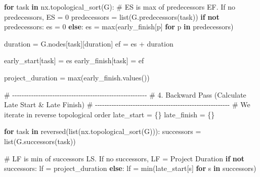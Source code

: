 \documentclass[
  letterpaper,
  DIV=11,
  numbers=noendperiod]{scrreprt}
\newenvironment{Shaded}{\begin{snugshade}}{\end{snugshade}}
\newcommand{\BuiltInTok}[1]{\textcolor[rgb]{0.00,0.23,0.31}{#1}}
\newcommand{\CommentTok}[1]{\textcolor[rgb]{0.37,0.37,0.37}{#1}}
\newcommand{\ControlFlowTok}[1]{\textcolor[rgb]{0.00,0.23,0.31}{\textbf{#1}}}
\newcommand{\DecValTok}[1]{\textcolor[rgb]{0.68,0.00,0.00}{#1}}
\newcommand{\KeywordTok}[1]{\textcolor[rgb]{0.00,0.23,0.31}{\textbf{#1}}}
\newcommand{\NormalTok}[1]{\textcolor[rgb]{0.00,0.23,0.31}{#1}}
\newcommand{\OperatorTok}[1]{\textcolor[rgb]{0.37,0.37,0.37}{#1}}
\newcommand{\StringTok}[1]{\textcolor[rgb]{0.13,0.47,0.30}{#1}}
\begin{document}
\begin{Shaded}
\begin{Highlighting}[]
\ControlFlowTok{for}\NormalTok{ task }\KeywordTok{in}\NormalTok{ nx.topological\_sort(G):}
    \CommentTok{\# ES is max of predecessor\textquotesingle{}s EF. If no predecessors, ES = 0}
\NormalTok{    predecessors }\OperatorTok{=} \BuiltInTok{list}\NormalTok{(G.predecessors(task))}
    \ControlFlowTok{if} \KeywordTok{not}\NormalTok{ predecessors:}
\NormalTok{        es }\OperatorTok{=} \DecValTok{0}
    \ControlFlowTok{else}\NormalTok{:}
\NormalTok{        es }\OperatorTok{=} \BuiltInTok{max}\NormalTok{(early\_finish[p] }\ControlFlowTok{for}\NormalTok{ p }\KeywordTok{in}\NormalTok{ predecessors)}
    
\NormalTok{    duration }\OperatorTok{=}\NormalTok{ G.nodes[task][}\StringTok{\textquotesingle{}duration\textquotesingle{}}\NormalTok{]}
\NormalTok{    ef }\OperatorTok{=}\NormalTok{ es }\OperatorTok{+}\NormalTok{ duration}
    
\NormalTok{    early\_start[task] }\OperatorTok{=}\NormalTok{ es}
\NormalTok{    early\_finish[task] }\OperatorTok{=}\NormalTok{ ef}

\NormalTok{project\_duration }\OperatorTok{=} \BuiltInTok{max}\NormalTok{(early\_finish.values())}

\CommentTok{\# {-}{-}{-}{-}{-}{-}{-}{-}{-}{-}{-}{-}{-}{-}{-}{-}{-}{-}{-}{-}{-}{-}{-}{-}{-}{-}{-}{-}{-}{-}{-}{-}{-}{-}{-}{-}{-}{-}{-}{-}{-}{-}{-}{-}{-}{-}{-}{-}{-}{-}{-}{-}{-}{-}{-}{-}{-}}
\CommentTok{\# 4. Backward Pass (Calculate Late Start \& Late Finish)}
\CommentTok{\# {-}{-}{-}{-}{-}{-}{-}{-}{-}{-}{-}{-}{-}{-}{-}{-}{-}{-}{-}{-}{-}{-}{-}{-}{-}{-}{-}{-}{-}{-}{-}{-}{-}{-}{-}{-}{-}{-}{-}{-}{-}{-}{-}{-}{-}{-}{-}{-}{-}{-}{-}{-}{-}{-}{-}{-}{-}}
\CommentTok{\# We iterate in reverse topological order}
\NormalTok{late\_start }\OperatorTok{=}\NormalTok{ \{\}}
\NormalTok{late\_finish }\OperatorTok{=}\NormalTok{ \{\}}

\ControlFlowTok{for}\NormalTok{ task }\KeywordTok{in} \BuiltInTok{reversed}\NormalTok{(}\BuiltInTok{list}\NormalTok{(nx.topological\_sort(G))):}
\NormalTok{    successors }\OperatorTok{=} \BuiltInTok{list}\NormalTok{(G.successors(task))}
    
    \CommentTok{\# LF is min of successor\textquotesingle{}s LS. If no successors, LF = Project Duration}
    \ControlFlowTok{if} \KeywordTok{not}\NormalTok{ successors:}
\NormalTok{        lf }\OperatorTok{=}\NormalTok{ project\_duration}
    \ControlFlowTok{else}\NormalTok{:}
\NormalTok{        lf }\OperatorTok{=} \BuiltInTok{min}\NormalTok{(late\_start[s] }\ControlFlowTok{for}\NormalTok{ s }\KeywordTok{in}\NormalTok{ successors)}
        

\end{Highlighting}
\end{Shaded}
\end{document}
